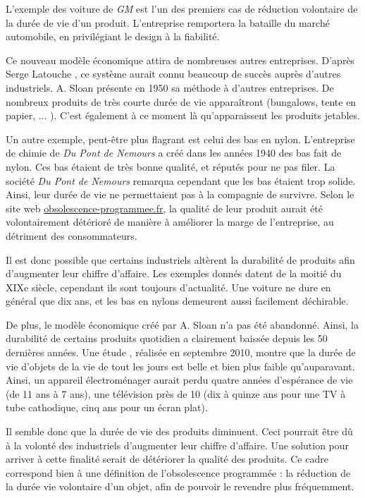 \bigbreak

L'exemple des voiture de \textit{GM} est l'un des premiers cas de réduction volontaire de la durée de vie d'un produit. L'entreprise remportera la bataille du marché automobile, en privilégiant le design à la fiabilité.

Ce nouveau modèle économique attira de nombreuses autres entreprises. D'après Serge Latouche \cite{bpc}, ce système aurait connu beaucoup de succès auprès d'autres industriels. A. Sloan présente en 1950 sa méthode à d'autres entreprises. De nombreux produits de très courte durée de vie apparaîtront (bungalows, tente en papier, ... ). C'est également à ce moment là qu'apparaissent les produits jetables.
 
 
\bigbreak
Un autre exemple, peut-être plus flagrant est celui des bas en nylon.
L'entreprise de chimie de \textit{Du Pont de Nemours} a créé dans les années 1940 des bas fait de nylon.
Ces bas étaient de très bonne qualité, et réputés pour ne pas filer. La société \textit{Du Pont de Nemours} remarqua cependant que les bas étaient trop solide. 
Ainsi, leur durée de vie ne permettaient pas à la compagnie de survivre.
Selon le site web \url{obsolescence-programmee.fr},  la qualité de leur produit aurait été volontairement détérioré de manière à améliorer la marge de l'entreprise, au détriment des consommateurs. 

\bigbreak
Il est donc possible que certains industriels altèrent la durabilité de produits afin d'augmenter leur chiffre d'affaire. Les exemples donnés datent de la moitié du XIXe siècle, cependant ils sont toujours d'actualité. Une voiture ne dure en général que dix ans, et les bas en nylons demeurent aussi facilement déchirable. 

De plus, le modèle économique créé par A. Sloan n'a pas été abandonné. Ainsi, la durabilité de certains produits quotidien a clairement baissée depuis les 50 dernières années. 
Une étude \cite{opSsg}, réalisée en septembre 2010, montre que la durée de vie d'objets de la vie de tout les jours est belle et bien plus faible qu'auparavant.
Ainsi, un appareil électroménager aurait perdu quatre années d'espérance de vie (de 11 ans à 7 ans), une télévision près de 10 (dix à quinze ans pour une TV à tube cathodique, cinq ans pour un écran plat). 

\bigbreak

Il semble donc que la durée de vie des produits diminuent. Ceci pourrait être dû à la volonté des industriels d'augmenter leur chiffre d'affaire. Une solution pour arriver à cette finalité serait de détériorer la qualité des produits. Ce cadre correspond  bien à une définition de l'obsolescence programmée : la réduction de la durée vie volontaire d'un objet, afin de pouvoir le revendre plus fréquemment. 
